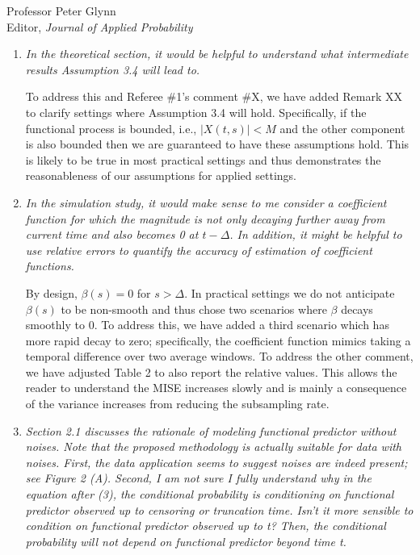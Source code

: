 \documentclass[11pt]{letter} %
\begin{document}
\begin{letter}{Professor
	Peter Glynn\\
	Editor, {\em Journal of Applied Probability}}
\begin{enumerate}
\vspace{5mm}
We now clarify that throughout the simulation studies and application we employ the penalization procedure to reduce overfitting.  We have found that without careful tuning of the penalty parameter, the overfitting can be severe as stated by the referee.
\vspace{5mm}

\item {\it In the theoretical section, it would be helpful to understand what intermediate results Assumption 3.4 will lead to.}

\vspace{5mm}
To address this and Referee \#1's comment \#X, we have added Remark XX to clarify settings where Assumption 3.4 will hold. Specifically, if the functional process is bounded, i.e., $|X(t,s)| < M$ and the other component is also bounded then we are guaranteed to have these assumptions hold.  This is likely to be true in most practical settings and thus demonstrates the reasonableness of our assumptions for applied settings.
\vspace{5mm}

\item {\it In the simulation study, it would make sense to me consider a coefficient function for which the magnitude is not only decaying further away from current time and also becomes 0 at $t-\Delta$. In addition, it might be helpful to use relative errors to quantify the accuracy of estimation of coefficient functions.}

\vspace{5mm}
By design, $\beta(s) = 0$ for $s > \Delta$.  In practical settings we do not anticipate~$\beta(s)$ to be non-smooth and thus chose two scenarios where $\beta$ decays smoothly to 0.  To address this, we have added a third scenario which has more rapid decay to zero; specifically, the coefficient function mimics taking a temporal difference over two average windows.   To address the other comment, we have adjusted Table 2 to also report the relative values.  This allows the reader to understand the MISE increases slowly and is mainly a consequence of the variance increases from reducing the subsampling rate.
\vspace{5mm}

\item {\it Section 2.1 discusses the rationale of modeling functional predictor without noises. Note that the proposed methodology is actually suitable for data with noises. First, the data application seems to suggest noises are indeed present; see Figure 2 (A). Second, I am not sure I fully understand why in the equation after (3), the conditional probability is conditioning on functional predictor observed up to censoring or truncation time. Isn’t it more sensible to condition on functional predictor observed up to t? Then, the conditional probability will not depend on functional predictor beyond time t.}


\end{enumerate}
\end{letter}
\end{document}
